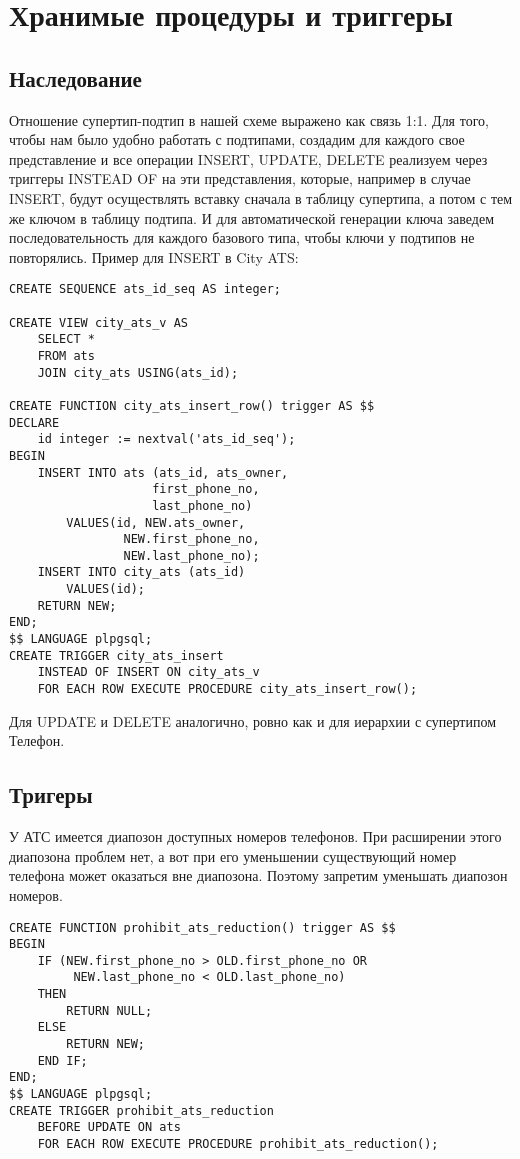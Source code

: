 \documentclass{report}
\begin{document}
\chapter{Хранимые процедуры и триггеры}

\section{Наследование}

Отношение супертип-подтип в нашей схеме выражено как связь 1:1. 
Для того, чтобы нам было удобно работать с подтипами, создадим
для каждого свое представление и все операции INSERT, UPDATE, DELETE
реализуем через триггеры INSTEAD OF на эти представления, которые,
например в случае INSERT, будут осуществлять вставку сначала в 
таблицу супертипа, а потом с тем же ключом в таблицу подтипа.
И для автоматической генерации ключа заведем последовательность 
для каждого базового типа, чтобы ключи у подтипов не повторялись.
Пример для INSERT в City ATS:
\begin{lstlisting}
CREATE SEQUENCE ats_id_seq AS integer;

CREATE VIEW city_ats_v AS
    SELECT *
    FROM ats 
    JOIN city_ats USING(ats_id); 

CREATE FUNCTION city_ats_insert_row() trigger AS $$
DECLARE
    id integer := nextval('ats_id_seq');
BEGIN
    INSERT INTO ats (ats_id, ats_owner, 
                    first_phone_no, 
                    last_phone_no)
        VALUES(id, NEW.ats_owner, 
                NEW.first_phone_no, 
                NEW.last_phone_no);
    INSERT INTO city_ats (ats_id)
        VALUES(id);
    RETURN NEW;
END;
$$ LANGUAGE plpgsql;
CREATE TRIGGER city_ats_insert 
    INSTEAD OF INSERT ON city_ats_v
    FOR EACH ROW EXECUTE PROCEDURE city_ats_insert_row();
\end{lstlisting}

Для UPDATE и DELETE аналогично, ровно как и для иерархии с супертипом
Телефон.

\section{Тригеры}

У АТС имеется диапозон доступных номеров телефонов. При расширении этого 
диапозона проблем нет, а вот при его уменьшении существующий номер 
телефона может оказаться вне диапозона. Поэтому запретим уменьшать 
диапозон номеров.

\begin{lstlisting}
CREATE FUNCTION prohibit_ats_reduction() trigger AS $$
BEGIN
    IF (NEW.first_phone_no > OLD.first_phone_no OR
         NEW.last_phone_no < OLD.last_phone_no)
    THEN
        RETURN NULL;
    ELSE
        RETURN NEW;
    END IF;
END;
$$ LANGUAGE plpgsql;
CREATE TRIGGER prohibit_ats_reduction 
    BEFORE UPDATE ON ats
    FOR EACH ROW EXECUTE PROCEDURE prohibit_ats_reduction();
\end{lstlisting}
\end{document}
